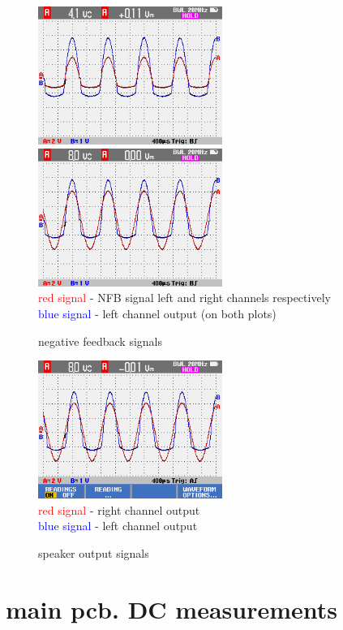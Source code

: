 \documentclass[a4paper,twoside]{report}
\begin{document}
\begin{figure}[hptb!]
    \centering
    \includegraphics[width=6cm]{img_report/left_NFB.png}
    \includegraphics[width=6cm]{img_report/right_NFB.png} \\ 
    \textcolor{Red}{red signal} - NFB signal left and right channels respectively \\
    \textcolor{Blue}{blue signal} - left channel output (on both plots) \\
 \caption{negative feedback signals}
 \label{fig:NFB}
\end{figure}

\begin{figure}[hptb!]
    \centering
    \includegraphics[width=6cm]{img_report/outputs_broken.png} \\
    \textcolor{Red}{red signal} - right channel output \\
    \textcolor{Blue}{blue signal} - left channel output \\
 \caption{speaker output signals}
 \label{fig:output}
\end{figure}

\newpage

\section{main pcb. DC measurements} \label{sec:dc-measurements}
\end{document}
